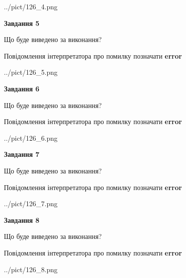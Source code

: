 \documentclass[12pt, ukrainian]{article}
\begin{document}
{\begin{center}
	{../pict/126_4.png}
\end{center}
\newpage

{\begin {center}\textbf{Завдання 5}\end {center}}\par
Що буде виведено за виконання? \par
Повідомлення інтерпретатора про помилку позначати \textbf{error}

\begin{center}
	{../pict/126_5.png}
\end{center}
\newpage

{\begin {center}\textbf{Завдання 6}\end {center}}\par
Що буде виведено за виконання? \par
Повідомлення інтерпретатора про помилку позначати \textbf{error}

\begin{center}
	{../pict/126_6.png}
\end{center}
\newpage

{\begin {center}\textbf{Завдання 7}\end {center}}\par
Що буде виведено за виконання? \par
Повідомлення інтерпретатора про помилку позначати \textbf{error}

\begin{center}
	{../pict/126_7.png}
\end{center}
\newpage

{\begin {center}\textbf{Завдання 8}\end {center}}\par
Що буде виведено за виконання? \par
Повідомлення інтерпретатора про помилку позначати \textbf{error}

\begin{center}
	{../pict/126_8.png}
\end{center}
\newpage

}
\end{document}
